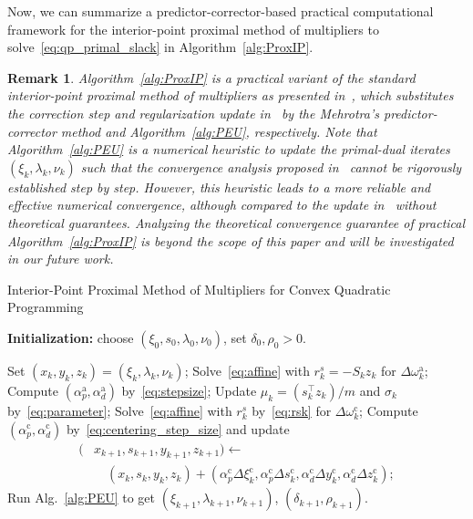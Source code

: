 \documentclass[letterpaper, 10 pt, conference]{ieeeconf}  \IEEEoverridecommandlockouts
\newtheorem{remark}{Remark}
\begin{document}
Now, we can summarize a predictor-corrector-based practical computational framework for the interior-point proximal 
method of multipliers to solve~\eqref{eq:qp_primal_slack} in Algorithm~\ref{alg:ProxIP}.
\begin{remark}
Algorithm~\ref{alg:ProxIP} is a practical variant of the standard interior-point proximal method of multipliers as presented in~\cite[Algorithm~1]{pougkakiotis2021}, which substitutes the correction step and regularization update in~\cite[Algorithm~1]{pougkakiotis2021} by the Mehrotra's predictor-corrector method and Algorithm~\ref{alg:PEU}, respectively. Note that Algorithm~\ref{alg:PEU} is a numerical heuristic to update the primal-dual iterates $(\xi_k,\lambda_k,\nu_k)$ such that the convergence analysis proposed in~\cite[Section~3]{pougkakiotis2021} cannot be rigorously established step by step. However, this heuristic leads to a more reliable and effective numerical convergence, although compared to the update in~\cite[Algorithm~1]{pougkakiotis2021} without theoretical guarantees.  
Analyzing the theoretical convergence guarantee of practical Algorithm~\ref{alg:ProxIP} is beyond the scope of this paper and will be investigated in our future work.    
\end{remark}
\vspace{-0.3cm}
\begin{algorithm}[htbp!]
\caption{Interior-Point Proximal Method of Multipliers for Convex Quadratic Programming}
\label{alg:ProxIP}
\small
\textbf{Initialization:} choose $(\xi_0,s_0,\lambda_0,\nu_0)$, set $\delta_0,\rho_0>0$.
\begin{algorithmic}[1]
\State \hspace{-3mm}Set $(x_k,  y_k,z_k)=(\xi_k,\lambda_k,\nu_k)$;
\State \hspace{-3mm}Solve~\eqref{eq:affine} with $r_k^s = -S_kz_k$ for 
$\Delta \omega_k^\text{a}$;
\State \hspace{-3mm}Compute $(\alpha_p^\text{a},\alpha_d^\text{a})$ by~\eqref{eq:stepsize};
\State \hspace{-3mm}Update $\mu_k=\left(s_k^\top z_k\right)/m$ and $\sigma_k$ by~\eqref{eq:parameter};
\State \hspace{-3mm}Solve~\eqref{eq:affine} with $r_k^s$ by~\eqref{eq:rsk} for $\Delta\omega_k^\text{c}$;
\State \hspace{-3mm}Compute $(\alpha^\text{c}_p,\alpha^\text{c}_d)$ by~\eqref{eq:centering_step_size} and update 
\[
\begin{aligned}
(&x_{k+1},s_{k+1},y_{k+1},z_{k+1}) \leftarrow    \\
&\quad (x_{k},s_{k},y_{k},z_{k}) +  (\alpha^\text{c}_p\Delta \xi_{k}^\text{c},\alpha^\text{c}_p\Delta s_{k}^\text{c},\alpha^\text{c}_d\Delta y_{k}^\text{c},\alpha^\text{c}_d\Delta z_{k}^\text{c});
\end{aligned}
\]
\State \hspace{-3mm}Run Alg.~\ref{alg:PEU} to get $(\xi_{k+1},\lambda_{k+1},\nu_{k+1})$, $(\delta_{k+1},\rho_{k+1})$. 
\EndFor
\end{algorithmic}
\end{algorithm}
\end{document}
